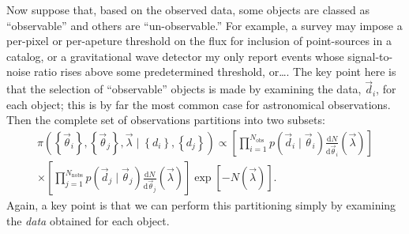 \documentclass[modern]{aastex62}
\newcommand{\dd}{\mathrm{d}}
\newcommand{\diff}[2]{\frac{\dd #1}{\dd #2}}
\newcommand{\Nnobs}{N_\mathrm{nobs}}
\newcommand{\Nobs}{N_\mathrm{obs}}
\newcommand{\vd}{\vec{d}}
\newcommand{\vlambda}{\vec{\lambda}}
\newcommand{\vtheta}{\vec{\theta}}
\begin{document}
Now suppose that, based on the observed data, some objects are classed as
``observable'' and others are ``un-observable.''  For example, a survey may
impose a per-pixel or per-apeture threshold on the flux for inclusion of
point-sources in a catalog, or a gravitational wave detector my only report
events whose signal-to-noise ratio rises above some predetermined threshold,
or\ldots.  The key point here is that the selection of ``observable'' objects is
made by examining the data, $\vd_i$, for each object; this is by far the most
common case for astronomical observations.  Then the complete set of
observations partitions into two subsets:
%
\begin{multline}
  \pi\left(\left\{ \vtheta_i \right\}, \left\{ \vtheta_j \right\}, \vlambda \mid \left\{ d_i \right\}, \left\{ d_j \right\}\right) \propto \left[ \prod_{i=1}^{\Nobs} p\left( \vd_i \mid \vtheta_i \right) \diff{N}{\vtheta_i}\left( \vlambda \right) \right] \\ \times \left[ \prod_{j=1}^{\Nnobs} p\left( \vd_j \mid \vtheta_j \right) \diff{N}{\vtheta_j}\left( \vlambda \right) \right] \exp\left[ - N\left( \vlambda \right) \right].
\end{multline}
%
Again, a key point is that we can perform this partitioning simply by examining
the \emph{data} obtained for each object.
\end{document}
